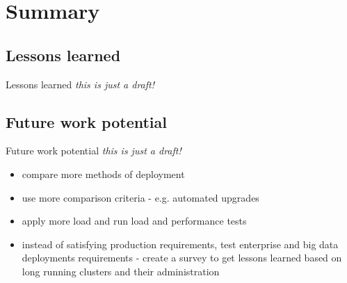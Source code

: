 \documentclass{beamer}
\begin{document}
\section{Summary}
\subsection{Lessons learned}
\begin{frame}{Lessons learned}%
	\textit{this is just a draft!}
\end{frame}
\subsection{Future work potential}
\begin{frame}{Future work potential}%
	\textit{this is just a draft!}
\begin{itemize}
	\item compare more methods of deployment
	\item use more comparison criteria - e.g. automated upgrades
	\item apply more load and run load and performance tests
	\item instead of satisfying production requirements, test enterprise and big data deployments requirements - create a survey to get lessons learned based on long running clusters and their administration
\end{itemize}
\end{frame}
\end{document}
